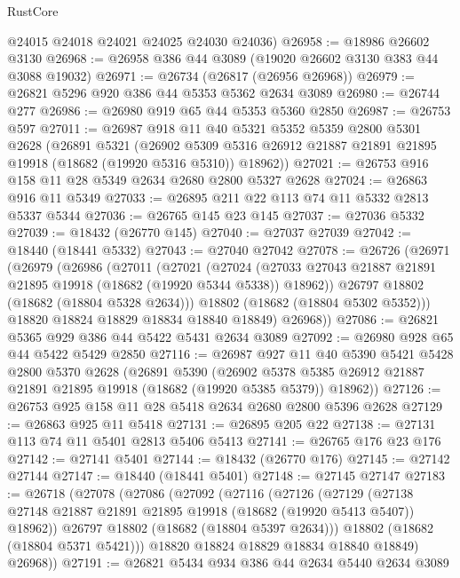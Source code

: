 \begin{lexlean}{RustCore}
\begin{coremodule}
      @24015
      @24018
      @24021
      @24025
      @24030
      @24036)
@26958 := @18986 @26602 @3130
@26968 := @26958 @386 @44 @3089 (@19020 @26602 @3130 @383 @44 @3088 @19032)
@26971 := @26734 (@26817 (@26956 @26968))
@26979 := @26821 @5296 @920 @386 @44 @5353 @5362 @2634 @3089
@26980 := @26744 @277
@26986 := @26980 @919 @65 @44 @5353 @5360 @2850
@26987 := @26753 @597
@27011 := @26987
    @918
    @11
    @40
    @5321
    @5352
    @5359
    @2800
    @5301
    @2628
    (@26891
      @5321
      (@26902 @5309 @5316 @26912 @21887 @21891 @21895 @19918 (@18682 (@19920 @5316 @5310)) @18962))
@27021 := @26753 @916 @158 @11 @28 @5349 @2634 @2680 @2800 @5327 @2628
@27024 := @26863 @916 @11 @5349
@27033 := @26895 @211 @22 @113 @74 @11 @5332 @2813 @5337 @5344
@27036 := @26765 @145 @23 @145
@27037 := @27036 @5332
@27039 := @18432 (@26770 @145)
@27040 := @27037 @27039
@27042 := @18440 (@18441 @5332)
@27043 := @27040 @27042
@27078 := @26726
    (@26971
      (@26979
        (@26986
          (@27011
            (@27021
              (@27024
                (@27033 @27043 @21887 @21891 @21895 @19918 (@18682 (@19920 @5344 @5338)) @18962))
              @26797
              @18802
              (@18682 (@18804 @5328 @2634)))
            @18802
            (@18682 (@18804 @5302 @5352)))
          @18820
          @18824
          @18829
          @18834
          @18840
          @18849)
        @26968))
@27086 := @26821 @5365 @929 @386 @44 @5422 @5431 @2634 @3089
@27092 := @26980 @928 @65 @44 @5422 @5429 @2850
@27116 := @26987
    @927
    @11
    @40
    @5390
    @5421
    @5428
    @2800
    @5370
    @2628
    (@26891
      @5390
      (@26902 @5378 @5385 @26912 @21887 @21891 @21895 @19918 (@18682 (@19920 @5385 @5379)) @18962))
@27126 := @26753 @925 @158 @11 @28 @5418 @2634 @2680 @2800 @5396 @2628
@27129 := @26863 @925 @11 @5418
@27131 := @26895 @205 @22
@27138 := @27131 @113 @74 @11 @5401 @2813 @5406 @5413
@27141 := @26765 @176 @23 @176
@27142 := @27141 @5401
@27144 := @18432 (@26770 @176)
@27145 := @27142 @27144
@27147 := @18440 (@18441 @5401)
@27148 := @27145 @27147
@27183 := @26718
    (@27078
      (@27086
        (@27092
          (@27116
            (@27126
              (@27129
                (@27138 @27148 @21887 @21891 @21895 @19918 (@18682 (@19920 @5413 @5407)) @18962))
              @26797
              @18802
              (@18682 (@18804 @5397 @2634)))
            @18802
            (@18682 (@18804 @5371 @5421)))
          @18820
          @18824
          @18829
          @18834
          @18840
          @18849)
        @26968))
@27191 := @26821 @5434 @934 @386 @44 @2634 @5440 @2634 @3089

\end{coremodule}
\end{lexlean}

